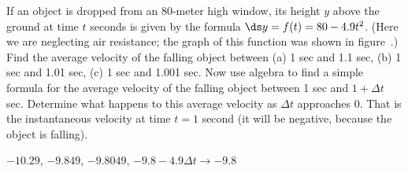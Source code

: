 \begin{exercises}
\begin{exercise}
If an object is dropped from an 80-meter high window, its height $y$ above
the ground at time $t$ seconds is given by the formula $\ds y=f(t)=80-4.9t^2$.
(Here we are neglecting air resistance; the graph of this function was
shown in figure~.)  Find the average velocity of
the falling object between (a) 1 sec and 1.1 sec, (b) 1 sec and 1.01 sec,
(c) 1 sec and 1.001 sec.  Now use algebra to find a simple formula for the
average velocity of the falling object between 1 sec and $1+\Delta t$ sec.
Determine what happens to this average velocity as $\Delta t$ approaches 0.
That is the instantaneous velocity at time $t=1$ second (it will be negative,
because the object is falling).
\begin{answer} $-10.29$, $-9.849$, $-9.8049$, \hfill\break
$-9.8-4.9\Delta t\rightarrow -9.8$
\end{answer}\end{exercise}

\end{exercises}
